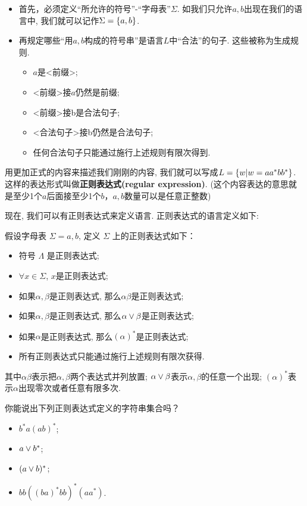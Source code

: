 \begin{itemize}
	\item 首先，必须定义“所允许的符号”-``字母表''$\Sigma$. 如我们只允许$a,b$出现在我们的语言中, 我们就可以记作$\Sigma=\{a,b\}$. 
	\item 再规定哪些“用$a, b$构成的符号串”是语言$L$中“合法”的句子. 这些被称为生成规则. 
	\begin{itemize}
		\item $a$是<前缀>;
		\item <前缀>接$a$仍然是前缀;
		\item <前缀>接b是合法句子;
		\item <合法句子>接b仍然是合法句子;
		\item 任何合法句子只能通过施行上述规则有限次得到.
	\end{itemize}
\end{itemize}

用更加正式的内容来描述我们刚刚的内容, 我们就可以写成$L = \{w | w = aa^*bb^*\}$. 这样的表达形式叫做\textbf{正则表达式(regular expression)}. (这个内容表达的意思就是至少1个$a$后面接至少1个$b$，$a,b$数量可以是任意正整数)

现在, 我们可以有正则表达式来定义语言. 正则表达式的语言定义如下: 

\begin{definition}[正则表达式语言的定义]
假设字母表 $\Sigma = {a,b}$, 定义 $\Sigma$ 上的正则表达式如下：
\begin{itemize}
	\item 符号 $\Lambda$ 是正则表达式;
	\item $\forall x\in \Sigma$, $x$是正则表达式;
	\item 如果$\alpha, \beta$是正则表达式, 那么$\alpha\beta$是正则表达式;
	\item 如果$\alpha, \beta$是正则表达式, 那么$\alpha \lor \beta$是正则表达式;
	\item 如果$\alpha$是正则表达式, 那么$(\alpha)^*$是正则表达式;
	\item 所有正则表达式只能通过施行上述规则有限次获得. 
\end{itemize}
	其中$\alpha\beta$表示把$\alpha, \beta$两个表达式并列放置; $\alpha \lor \beta$表示$\alpha, \beta$的任意一个出现; $(\alpha)^*$表示$\alpha$出现零次或者任意有限多次. 
\end{definition}


\begin{prob}
	你能说出下列正则表达式定义的字符串集合吗？
	\begin{itemize}
		\item $b^*a(ab)^*$;
		\item $a\lor b^*$;
		\item $(a\lor b)^*$;
		\item $bb((ba)^*bb)^*(aa^*)$.
	\end{itemize}
\end{prob} 


